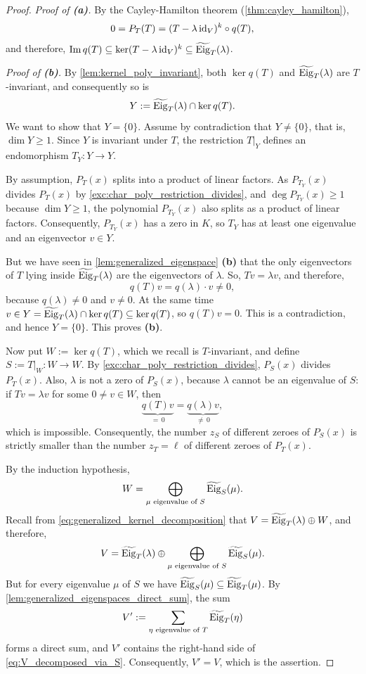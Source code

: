 \begin{proof}
\textit{Proof of \textbf{(a)}.} By the Cayley-Hamilton theorem (\cref{thm:cayley_hamilton}),
\[
    0 = P_T(T) = (T - \lambda \operatorname{id}_V)^k \circ q(T),
\]
and therefore, $\operatorname{Im} q(T) \subseteq \ker(T - \lambda \operatorname{id}_V)^k \subseteq \widetilde{\operatorname{Eig}}_T(\lambda)$.

\textit{Proof of \textbf{(b)}.} By \cref{lem:kernel_poly_invariant}, both $\ker q(T)$ and $\widetilde{\operatorname{Eig}}_T(\lambda)$ are $T$-invariant, and consequently so is
\[
    Y := \widetilde{\operatorname{Eig}}_T(\lambda) \cap \ker q(T).
\]
We want to show that $Y = \{0\}$. Assume by contradiction that $Y \neq \{0\}$, that is, $\dim Y \ge 1$. Since $Y$ is invariant under $T$, the restriction $T|_Y$ defines an endomorphism $T_Y \colon Y \to Y$.

By assumption, $P_T(x)$ splits into a product of linear factors. As $P_{T_Y}(x)$ divides $P_T(x)$ by \cref{exc:char_poly_restriction_divides}, and $\deg P_{T_Y}(x) \ge 1$ because $\dim Y \ge 1$, the polynomial $P_{T_Y}(x)$ also splits as a product of linear factors. Consequently, $P_{T_Y}(x)$ has a zero in $K$, so $T_Y$ has at least one eigenvalue and an eigenvector $v \in Y$.

But we have seen in \cref{lem:generalized_eigenspace} \textbf{(b)} that the only eigenvectors of $T$ lying inside $\widetilde{\operatorname{Eig}}_T(\lambda)$ are the eigenvectors of $\lambda$. So, $Tv = \lambda v$, and therefore,
\[
    q(T)v = q(\lambda) \cdot v \neq 0,
\]
because $q(\lambda) \neq 0$ and $v \neq 0$. At the same time $v \in Y = \widetilde{\operatorname{Eig}}_T(\lambda) \cap \ker q(T) \subseteq \ker q(T)$, so $q(T)v = 0$. This is a contradiction, and hence $Y = \{0\}$. This proves \textbf{(b)}.

Now put $W := \ker q(T)$, which we recall is $T$-invariant, and define $S := T|_W \colon W \to W$. By \cref{exc:char_poly_restriction_divides}, $P_S(x)$ divides $P_T(x)$. Also, $\lambda$ is not a zero of $P_S(x)$, because $\lambda$ cannot be an eigenvalue of $S$: if $Tv = \lambda v$ for some $0 \neq v \in W$, then
\[
    \underbrace{q(T)v}_{= \, 0} = \underbrace{q(\lambda) v}_{\neq \, 0},
\]
which is impossible. Consequently, the number $z_S$ of different zeroes of $P_S(x)$ is strictly smaller than the number $z_T = \ell$ of different zeroes of $P_T(x)$.

By the induction hypothesis,
\[
    W = \bigoplus_{\mu \text{ eigenvalue of } S} \widetilde{\operatorname{Eig}}_S(\mu).
\]
Recall from \eqref{eq:generalized_kernel_decomposition} that $V = \widetilde{\operatorname{Eig}}_T(\lambda) \oplus W$, and therefore,
\begin{equation}
\label{eq:V_decomposed_via_S}
    V = \widetilde{\operatorname{Eig}}_T(\lambda) \oplus \bigoplus_{\mu \text{ eigenvalue of } S} \widetilde{\operatorname{Eig}}_S(\mu).
\end{equation}
But for every eigenvalue $\mu$ of $S$ we have $\widetilde{\operatorname{Eig}}_S(\mu) \subseteq \widetilde{\operatorname{Eig}}_T(\mu)$. By \cref{lem:generalized_eigenspaces_direct_sum}, the sum
\[
    V' := \sum_{\eta \text{ eigenvalue of } T} \widetilde{\operatorname{Eig}}_T(\eta)
\]
forms a direct sum, and $V'$ contains the right-hand side of \eqref{eq:V_decomposed_via_S}. Consequently, $V' = V$, which is the assertion.
\end{proof}


